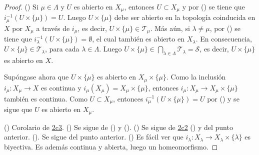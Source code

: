 \begin{proof}
({}) Si $\mu \in \Lambda$ y $U$ es abierto en $X_{\mu}$, entonces $U \subset X_{\mu}$ y por ({}) se tiene que $i^{-1}_{\mu}(U \times \{ \mu \}) = U$. Luego $U \times \{ \mu \}$ debe ser abierto en la topología coinducida en $X$ por $X_{\mu}$ a través de $i_{\mu}$, es decir, $U \times \{ \mu \} \in \mathcal{T}_{\mu}$. Más aún, si $\lambda \ne \mu$, por ({}) se tiene que $i^{-1}_{\lambda}(U \times \{ \mu \}) = \emptyset$, el cual también es abierto en $X_{\lambda}$. En consecuencia, $U \times \{ \mu \} \in \mathcal{T}_{\lambda}$, para cada $\lambda \in \Lambda$. Luego $U \times \{ \mu \} \in \bigcap_{\lambda \in \Lambda} \mathcal{T}_{\lambda} = \mathcal{S}$, es decir, $U \times \{ \mu \}$ es abierto en $X$.
\bigskip

Supóngase ahora que $U \times \{ \mu \}$ es abierto en $X_{\mu} \times \{ \mu \}$. Como la inclusión $i_{\mu} : X_{\mu} \longrightarrow X$ es continua y $i_{\mu}(X_{\mu}) = X_{\mu} \times \{ \mu \}$, entonces $i_{\mu} : X_{\mu} \longrightarrow X_{\mu} \times \{ \mu \}$ también es continua. Como $U \subset X_{\mu}$, entonces $i^{-1}_{\mu}(U \times \{ \mu \}) = U$ por ({}) y se sigue que $U$ es abierto en $X_{\mu}$.
\bigskip

({}) Corolario de \hyperref[card:2c3]{\textsf{2c3}}. ({}) Se sigue de ({}) y ({}). ({}) Se sigue de \hyperref[card:2c2]{\textsf{2c2}} ({}) y del punto anterior. ({}). Se sigue del punto anterior. ({}) Es fácil ver que $i_{\lambda} : X_{\lambda} \longrightarrow X_{\lambda} \times \{ \lambda \}$ es biyectiva. Es además continua y abierta, luego un homeomorfismo.

\end{proof}
